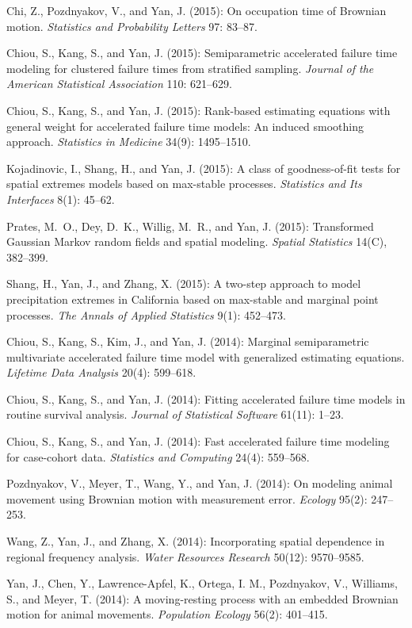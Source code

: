 \documentclass[Statistics]{vita}
\begin{document}
\begin{vita}
\begin{Publications}
\begin{RefereedJournalArticles}
  \item Chi, Z., Pozdnyakov, V., and Yan, J. (2015): On occupation time of Brownian motion. {\em Statistics and Probability Letters\/} 97: 83--87.
  \item *Chiou, S., Kang, S., and Yan, J. (2015): Semiparametric accelerated failure time modeling for clustered failure times from stratified sampling. {\em Journal of the American Statistical Association\/} 110: 621--629.
  \item *Chiou, S., Kang, S., and Yan, J. (2015): Rank-based estimating equations with general weight for accelerated failure time models: An induced smoothing approach. {\em Statistics in Medicine\/} 34(9): 1495--1510.
  \item Kojadinovic, I., Shang, H., and Yan, J. (2015): A class of goodness-of-fit tests for spatial extremes models based on max-stable processes. {\em Statistics and Its Interfaces\/} 8(1): 45--62.
  \item *Prates, M.~O., Dey, D.~K., Willig, M.~R., and Yan, J. (2015): Transformed Gaussian Markov random fields and spatial modeling. {\em Spatial Statistics\/} 14(C), 382--399.
  \item *Shang, H., Yan, J., and Zhang, X. (2015): A two-step approach to model precipitation extremes in {C}alifornia based on max-stable and marginal point processes. {\em The Annals of Applied Statistics\/} 9(1): 452--473.
  \item *Chiou, S., Kang, S., Kim, J., and Yan, J. (2014): Marginal semiparametric multivariate accelerated failure time model with generalized estimating equations. {\em Lifetime Data Analysis\/} 20(4): 599--618.
  \item *Chiou, S., Kang, S., and Yan, J. (2014): Fitting accelerated failure time models in routine survival analysis. {\em Journal of Statistical Software\/} 61(11): 1--23.
  \item *Chiou, S., Kang, S., and Yan, J. (2014): Fast accelerated failure time modeling for case-cohort data. {\em Statistics and Computing\/} 24(4): 559--568.
  \item Pozdnyakov, V., Meyer, T., Wang, Y., and Yan, J. (2014): On modeling animal movement using Brownian motion with measurement error. {\em Ecology\/} 95(2): 247--253.
  \item *Wang, Z., Yan, J., and Zhang, X. (2014): Incorporating spatial dependence in regional frequency analysis. {\em Water Resources Research\/} 50(12): 9570--9585.
  \item Yan, J., Chen, Y., Lawrence-Apfel, K., Ortega, I. M., Pozdnyakov, V., Williams, S., and Meyer, T. (2014): A moving-resting process with an embedded Brownian motion for animal movements. {\em Population Ecology\/} 56(2): 401--415.

\end{RefereedJournalArticles}
\end{Publications}
\end{vita}
\end{document}
